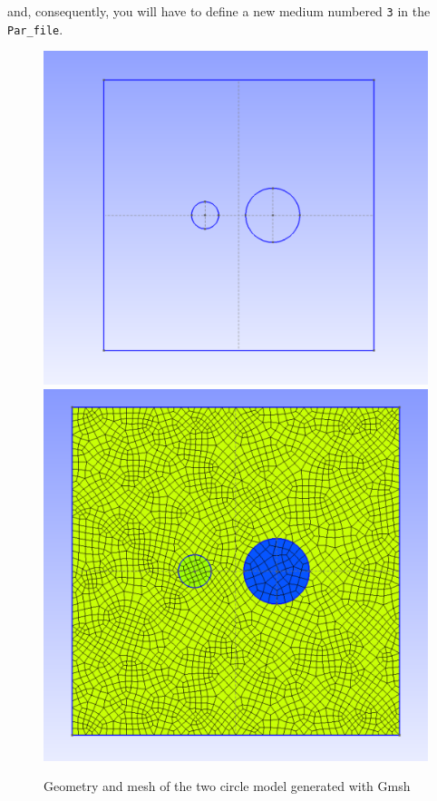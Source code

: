 \documentclass[oneside,english,onecolumn,letterpaper]{book}
\begin{document}
\medskip{}


and, consequently, you will have to define a new medium numbered \texttt{3}
in the \texttt{Par\_file}.

\begin{figure}[htbp]
\centerline{\includegraphics[width=0.481\columnwidth]{figures/Gmsh_geo}\hspace*{2mm}\includegraphics[width=0.43\columnwidth]{figures/Gmsh_Msh}}
\caption{Geometry and mesh of the two circle model generated with Gmsh\label{fig:Gmsh-example}}
\end{figure}
\end{document}
